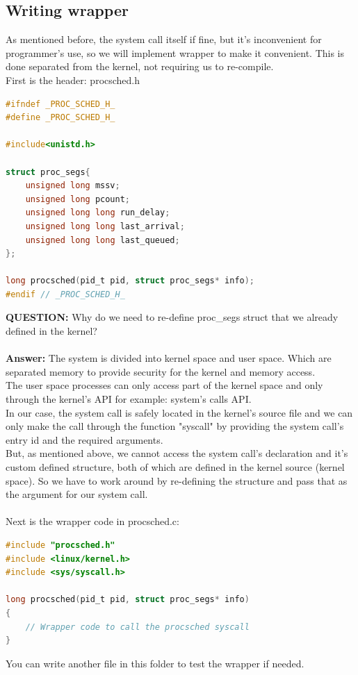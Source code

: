 \documentclass[a4paper]{article}
\begin{document}
\subsection{Writing wrapper}
As mentioned before, the system call itself if fine, but it's inconvenient for programmer's use, so we will implement wrapper to make it convenient. This is done separated from the kernel, not requiring us to re-compile.\\
First is the header: procsched.h
\begin{lstlisting}[language=c]
#ifndef _PROC_SCHED_H_
#define _PROC_SCHED_H_

#include<unistd.h>

struct proc_segs{
	unsigned long mssv;
	unsigned long pcount;
	unsigned long long run_delay;
	unsigned long long last_arrival;
	unsigned long long last_queued;
};

long procsched(pid_t pid, struct proc_segs* info);
#endif // _PROC_SCHED_H_
\end{lstlisting}
\textbf{QUESTION:} Why do we need to re-define proc\_segs struct that we already defined in the kernel?\\\\
\textbf{Answer:} The system is divided into kernel space and user space. Which are separated memory to provide security for the kernel and memory access.\\
The user space processes can only access part of the kernel space and only through the kernel's API for example: system's calls API.\\
In our case, the system call is safely located in the kernel's source file and we can only make the call through the function "syscall" by providing the system call's entry id and the required arguments.\\
But, as mentioned above, we cannot access the system call's declaration and it's custom defined structure, both of which are defined in the kernel source (kernel space). So we have to work around by re-defining the structure and pass that as the argument for our system call.\\\\
Next is the wrapper code in procsched.c:
\begin{lstlisting}[language=c]
#include "procsched.h"
#include <linux/kernel.h>
#include <sys/syscall.h>

long procsched(pid_t pid, struct proc_segs* info)
{
	// Wrapper code to call the procsched syscall
}
\end{lstlisting}
You can write another file in this folder to test the wrapper if needed.
\end{document}
